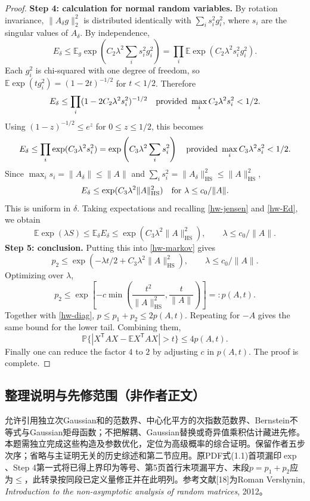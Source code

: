 \documentclass[UTF8,11pt]{ctexart}
\theoremstyle{definition}
\begin{document}
\begin{proof}
\textbf{Step 4: calculation for normal random variables.}
By rotation invariance, $\|A_\delta g\|_2^2$ is distributed identically
with $\sum_i s_i^2g_i^2$, where $s_i$ are the singular values of $A_\delta$.
By independence,
\[
E_\delta\leq\mathbb E_g\exp\left(C_2\lambda^2\sum_i s_i^2g_i^2\right)
=\prod_i\mathbb E\exp(C_2\lambda^2s_i^2g_i^2).
\]
Each $g_i^2$ is chi-squared with one degree of freedom, so
$\mathbb E\exp(tg_i^2)=(1-2t)^{-1/2}$ for $t<1/2$. Therefore
\[
E_\delta\leq\prod_i(1-2C_2\lambda^2s_i^2)^{-1/2}
\quad\hbox{provided }\max_i C_2\lambda^2s_i^2<1/2.
\]
Using $(1-z)^{-1/2}\leq e^z$ for $0\leq z\leq1/2$, this becomes
\[
E_\delta\leq\prod_i\exp(C_3\lambda^2s_i^2)
=\exp\left(C_3\lambda^2\sum_i s_i^2\right)
\quad\hbox{provided }\max_i C_3\lambda^2s_i^2<1/2.
\]
Since $\max_i s_i=\|A_\delta\|\leq\|A\|$ and
$\sum_i s_i^2=\|A_\delta\|_{\mathrm{HS}}^2\leq\|A\|_{\mathrm{HS}}^2$,
\[
E_\delta\leq\exp(C_3\lambda^2\|A\|_{\mathrm{HS}}^2)
\quad\hbox{for }\lambda\leq c_0/\|A\|.
\]
This is uniform in $\delta$. Taking expectations and recalling
\eqref{hw-jensen} and \eqref{hw-Ed}, we obtain
\[
\mathbb E\exp(\lambda S)\leq\mathbb E_\delta E_\delta
\leq\exp(C_3\lambda^2\|A\|_{\mathrm{HS}}^2),\qquad \lambda\leq c_0/\|A\|.
\]
\textbf{Step 5: conclusion.}
Putting this into \eqref{hw-markov} gives
\[
p_2\leq\exp(-\lambda t/2+C_3\lambda^2\|A\|_{\mathrm{HS}}^2),
\qquad\lambda\leq c_0/\|A\|.
\]
Optimizing over $\lambda$,
\[
p_2\leq\exp\left[-c\min\left(\frac{t^2}{\|A\|_{\mathrm{HS}}^2},
\frac{t}{\|A\|}\right)\right]=:p(A,t).
\]
Together with \eqref{hw-diag}, $p\leq p_1+p_2\leq2p(A,t)$.
Repeating for $-A$ gives the same bound for the lower tail. Combining them,
\[
\mathbb P\{|X^{\mathsf T}AX-\mathbb E X^{\mathsf T}AX|>t\}\leq4p(A,t).
\]
Finally one can reduce the factor $4$ to $2$ by adjusting $c$ in $p(A,t)$.
The proof is complete.
\end{proof}

\subsection*{整理说明与先修范围（非作者正文）}
允许引用独立次Gaussian和的范数界、中心化平方的次指数范数界、Bernstein不等式与Gaussian矩母函数；不把解耦、Gaussian替换或奇异值乘积估计藏进先修。本题需独立完成这些构造及参数优化，定位为高级概率的综合证明。保留作者五步次序；省略与主证明无关的历史综述和第二节应用。原PDF式(1.1)首项漏印$\exp$、Step 4第一式将已得上界印为等号、第5页首行末项漏平方、末段$p=p_1+p_2$应为$\leq$，此转录按同段已定义量修正并在此明列。参考文献[18]为Roman Vershynin, \emph{Introduction to the non-asymptotic analysis of random matrices}, 2012。
\end{document}
